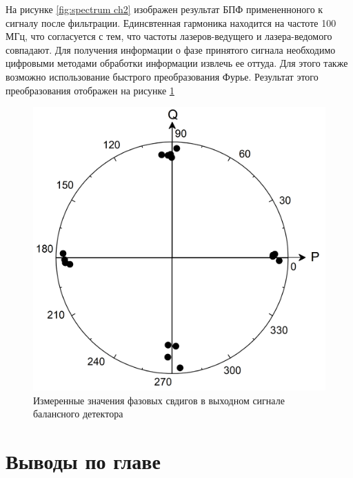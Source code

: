 На рисунке \ref{fig:spectrum ch2} изображен результат БПФ примененноного к сигналу после фильтрации. Единсвтенная гармоника находится на частоте 100 МГц, что согласуется с тем, что частоты лазеров-ведущего и лазера-ведомого совпадают.
Для получения информации о фазе принятого сигнала необходимо цифровыми методами обработки информации извлечь ее оттуда. Для этого также возможно использование быстрого преобразования Фурье. Результат этого преобразования отображен на рисунке \ref{fig:phase meas ch2} 
\begin{figure}
    \centering
    \includegraphics[width=0.7\linewidth]{images/06.png}
    \caption{Измеренные значения фазовых свдигов в выходном сигнале балансного детектора}
    \label{fig:phase meas ch2}
\end{figure}


\section{Выводы по главе}\label{sec:ch2/sect8}
